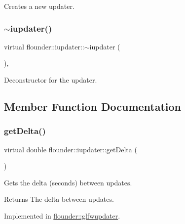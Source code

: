 Creates a new updater. 

\mbox{\label{classflounder_1_1iupdater_a70569371d9b898b7d30442a4463fbee4}} 
\subsubsection{\texorpdfstring{$\sim$iupdater()}{~iupdater()}}
{\footnotesize\ttfamily virtual flounder\+::iupdater\+::$\sim$iupdater (\begin{DoxyParamCaption}{ }\end{DoxyParamCaption})\hspace{0.3cm}{\ttfamily [inline]}, {\ttfamily [virtual]}}



Deconstructor for the updater. 



\subsection{Member Function Documentation}
\mbox{\label{classflounder_1_1iupdater_a1e8d40602f9799fc82d96d5b845cf796}} 
\subsubsection{\texorpdfstring{get\+Delta()}{getDelta()}}
{\footnotesize\ttfamily virtual double flounder\+::iupdater\+::get\+Delta (\begin{DoxyParamCaption}{ }\end{DoxyParamCaption})\hspace{0.3cm}{\ttfamily [pure virtual]}}



Gets the delta (seconds) between updates. 

\begin{DoxyReturn}{Returns}
The delta between updates. 
\end{DoxyReturn}


Implemented in \hyperlink{classflounder_1_1glfwupdater_a8da4916f3335126413a072203b94a735}{flounder\+::glfwupdater}.

